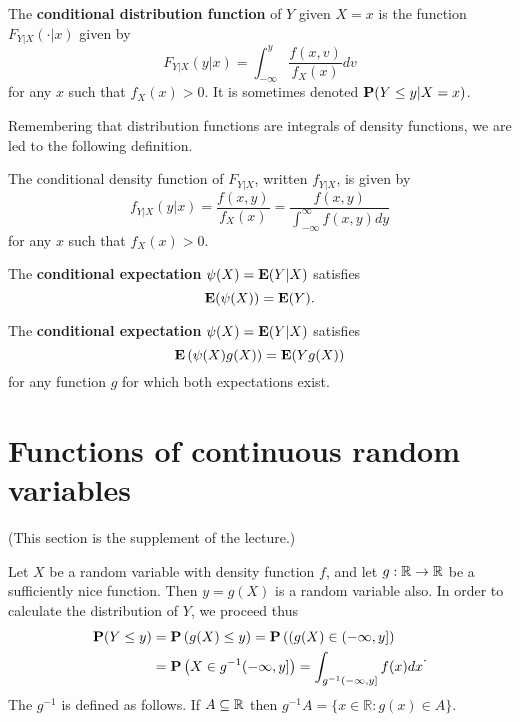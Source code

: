 \begin{definition}
The \textbf{conditional distribution function} of $Y$ given $X = x$ is the function $F_{Y\vert X} (\cdot \vert x)$ given by
\begin{equation*}
    F_{Y | X}(y | x)=\int_{-\infty}^{y} \frac{f(x, v)}{f_{X}(x)} d v
\end{equation*}
for any $x$ such that $f_X(x) > 0$. It is sometimes denoted $\mathbf{P} (Y \leq y \vert X = x)$. 
\end{definition}

Remembering that distribution functions are integrals of density functions, we are led to the following definition. 
\begin{definition}
The conditional density function of $F_{Y\vert X}$, written $f_{Y\vert X}$, is given by
\begin{equation*}
    f_{Y | X}(y | x)=\frac{f(x, y)}{f_{X}(x)} = \frac{f(x, y)}{\int_{-\infty}^{\infty} f(x, y) d y}
\end{equation*}
for any $x$ such that $f_X(x) > 0$. 
\end{definition}

\begin{theorem}
The \textbf{conditional expectation} $\psi(X) = \mathbf{E}(Y \vert X)$ satisfies 
\begin{equation*}
    \mathbf{E}(\psi(X)) = \mathbf{E}(Y).
\end{equation*}
\end{theorem}

\begin{theorem}
The \textbf{conditional expectation} $\psi(X) = \mathbf{E}(Y \vert X)$ satisfies 
\begin{equation*}
    \mathbf{E}\left( \psi(X) g(X) \right) = \mathbf{E}(Y g(X))
\end{equation*}
for any function $g$ for which both expectations exist.
\end{theorem}



\section{Functions of continuous random variables}
(This section is the supplement of the lecture.)

Let $X$ be a random variable with density function $f$, and let $g : \mathbb{R} \to \mathbb{R}$ be a sufficiently nice 
function. Then $y = g(X)$ is a random variable also. In order to calculate the distribution of $Y$, we proceed thus
\begin{equation*}
    \begin{aligned} 
        \mathbf{P}(Y \leq y) &= \mathbf{P}\left(g(X) \leq y\right) = \mathbf{P}\left((g(X) \in(-\infty, y] \right) \\
        &=\mathbf{P}\left(X \in g^{-1}(-\infty, y]\right)=\int_{g^{-1}(-\infty, y]} f(x) d x\end{aligned}.
\end{equation*}
The $g^{-1}$ is defined as follows. If $A \subseteq \mathbb{R}$ then $g^{-1} A=\{x \in \mathbb{R}: g(x) \in A\}$.

